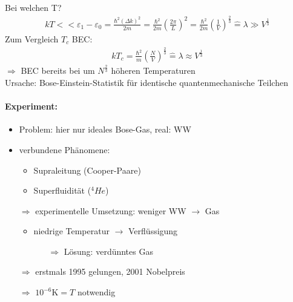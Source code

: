 Bei welchen T?
\begin{align}
    kT << \varepsilon_1-\varepsilon_0 = \frac{\hbar^2(\Delta k)^2}{2m} = \frac{\hbar^2}{2m}\left(\frac{2\pi}{L}\right)^2 = \frac{\hbar^2}{2m}\left(\frac{1}{V}\right)^{\frac{2}{3}} \widehat{=} \lambda \gg V^{\frac{1}{3}}
\end{align}
Zum Vergleich $T_c$ BEC:
\begin{align}
    kT_c = \frac{\hbar^2}{m}\left(\frac{N}{V}\right)^{\frac{2}{3}} \widehat{=} \lambda \approx V^{\frac{1}{3}}
\end{align}
$\Rightarrow$ BEC bereits bei um $N^{\frac{2}{3}}$ höheren Temperaturen \\
Ursache: Bose-Einstein-Statistik für identische quantenmechanische Teilchen

\paragraph{Experiment:}
\begin{itemize}
    \item Problem: hier nur ideales Bose-Gas, real: WW
    \item verbundene Phänomene:
    \begin{itemize}
        \item Supraleitung (Cooper-Paare)
        \item Superfluidität ($^4 He$)
    \end{itemize}
    \item[$\Rightarrow$] experimentelle Umsetzung: weniger WW $\rightarrow$ Gas
    \begin{itemize}
        \item niedrige Temperatur $\rightarrow$ Verflüssigung
        \begin{itemize}
            \item[$\Rightarrow$] Lösung: verdünntes Gas 
        \end{itemize}
    \end{itemize}
    \item[$\Rightarrow$] erstmals 1995 gelungen, 2001 Nobelpreis
    \item[$\Rightarrow$] $10^{-6} \si{\K} = T$ notwendig
\end{itemize}

